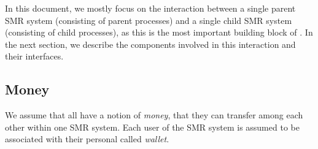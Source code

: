 In this document, we mostly focus on the interaction between a single parent SMR system (consisting of parent processes) and a single child SMR system (consisting of child processes), as this is the most important building block of \nameAbbr.
In the next section, we describe the components involved in this interaction and their interfaces.

\subsection{Money}

We assume that all \dapps have a notion of \emph{money}, that they can transfer among each other within one SMR system.
Each user of the SMR system is assumed to be associated with their personal \dapp called \emph{wallet}.
